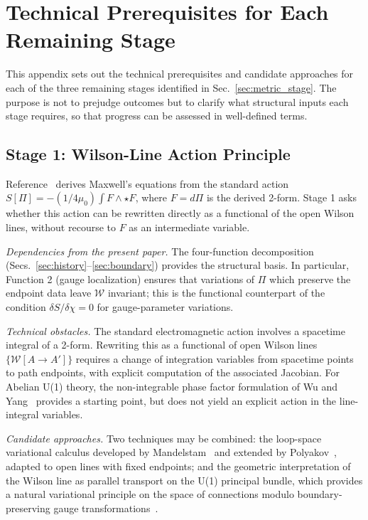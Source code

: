 \documentclass[%
 reprint, amsmath,amssymb, aps, prb, ]{revtex4-2}
\numberwithin{equation}{section}
\newcommand{\WL}{\mathcal{W}}
\newcommand{\hodge}{\star}
\begin{document}
\section{Technical Prerequisites for Each Remaining Stage}
\label{app:staged}

This appendix sets out the technical prerequisites and candidate approaches for each of the three remaining stages identified in Sec.~\ref{sec:metric_stage}. The purpose is not to prejudge outcomes but to clarify what structural inputs each stage requires, so that progress can be assessed in well-defined terms.

\subsection{Stage 1: Wilson-Line Action Principle}
\label{app:stage1}

Reference~\cite{hanamura54} derives Maxwell's equations from the standard action $S[\Pi] = -(1/4\mu_0)\int F \wedge \hodge F$, where $F = d\Pi$ is the derived 2-form. Stage 1 asks whether this action can be rewritten directly as a functional of the open Wilson lines, without recourse to $F$ as an intermediate variable.

\textit{Dependencies from the present paper.} The four-function decomposition (Secs.~\ref{sec:history}--\ref{sec:boundary}) provides the structural basis. In particular, Function 2 (gauge localization) ensures that variations of $\Pi$ which preserve the endpoint data leave $\WL$ invariant; this is the functional counterpart of the condition $\delta S / \delta \chi = 0$ for gauge-parameter variations.

\textit{Technical obstacles.} The standard electromagnetic action involves a spacetime integral of a 2-form. Rewriting this as a functional of open Wilson lines $\{\WL[A\to A']\}$ requires a change of integration variables from spacetime points to path endpoints, with explicit computation of the associated Jacobian. For Abelian U(1) theory, the non-integrable phase factor formulation of Wu and Yang~\cite{WuYang1975} provides a starting point, but does not yield an explicit action in the line-integral variables.

\textit{Candidate approaches.} Two techniques may be combined: the loop-space variational calculus developed by Mandelstam~\cite{Mandelstam1968} and extended by Polyakov~\cite{Polyakov1979}, adapted to open lines with fixed endpoints; and the geometric interpretation of the Wilson line as parallel transport on the U(1) principal bundle, which provides a natural variational principle on the space of connections modulo boundary-preserving gauge transformations~\cite{Nakahara2003}.
\end{document}
